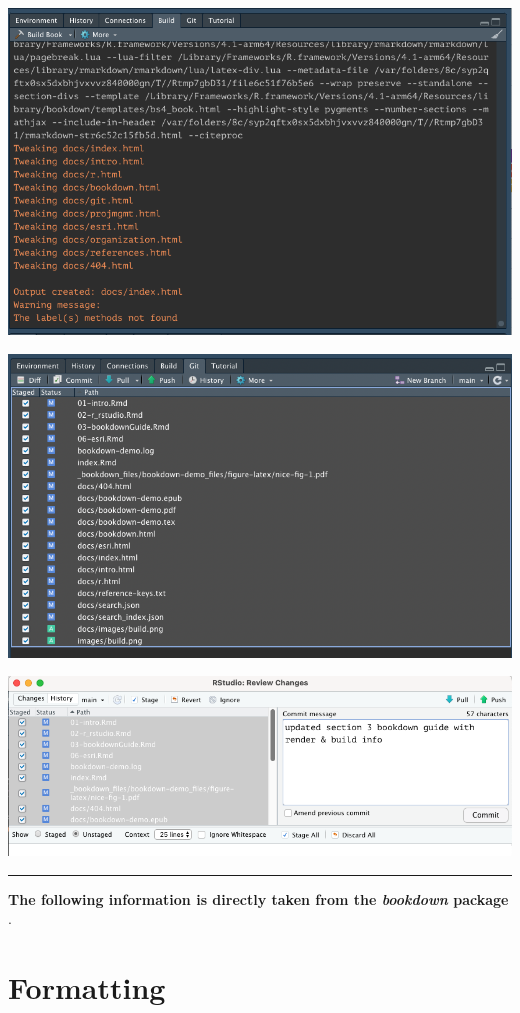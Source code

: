 \documentclass[
]{book}
\begin{document}
\begin{center}\includegraphics[width=0.75\linewidth]{images/build} \end{center}

\begin{center}\includegraphics[width=0.75\linewidth]{images/select} \end{center}

\begin{center}\includegraphics[width=0.75\linewidth]{images/commit} \end{center}

\begin{center}\rule{0.5\linewidth}{0.5pt}\end{center}

\textbf{The following information is directly taken from the \emph{bookdown} package} \citep{R-bookdown}.

\hypertarget{formatting}{%
\section{Formatting}\label{formatting}}
\end{document}
